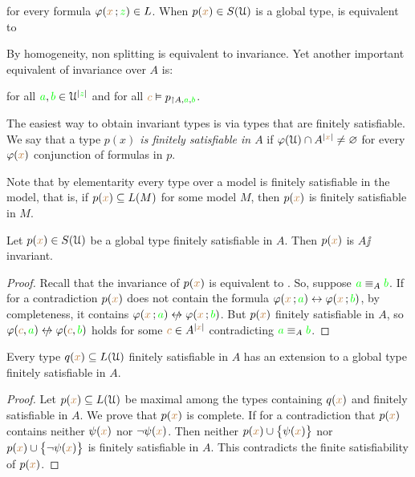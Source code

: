 \documentclass[creche.tex]{subfiles}
\begin{document}
for every formula $\varphi({\color{brown} x}\,;{\color{green} z})\in L$. When $p({\color{brown} x})\in S(\EuScript U)$ is a global type,  is equivalent to


By homogeneity, non splitting is equivalent to invariance. Yet another important equivalent of invariance over $A$ is:

\hfill for all ${\color{green} a},{\color{green} b}\in\EuScript U^{|{\color{green} z}|}$ and for all ${\color{brown} c}\vDash p_{\restriction A,{\color{green} a},{\color{green} b}}$. 

The easiest way to obtain invariant types is via types that are finitely satisfiable. We say that a type \emph{$p(x)$ is finitely satisfiable in $A$\/} if $\varphi(\EuScript U)\cap A^{|{\color{brown} x}|}\neq\varnothing$ for every $\varphi({\color{brown} x})$ conjunction of formulas in $p$. 

Note that by elementarity every type over a model is finitely satisfiable in the model, that is, if $p({\color{brown} x})\subseteq L(M)$ for some model $M$, then $p({\color{brown} x})$ is finitely satisfiable in $M$.


\begin{proposition}\label{prop_coeredi_invarienti}
Let $p({\color{brown} x})\in S(\EuScript U)$ be a global type finitely satisfiable in $A$. Then $p({\color{brown} x})$ is $A\jj$in\-vari\-ant.
\end{proposition}

\begin{proof}
Recall that the invariance of $p({\color{brown} x})$ is equivalent to . So, suppose ${\color{green} a}\equiv_A{\color{green} b}$. If for a contradiction $p({\color{brown} x})$ does not contain the formula $\varphi({\color{brown} x}\,;{\color{green} a})\leftrightarrow\varphi({\color{brown} x}\,;{\color{green} b})$, by completeness, it contains  $\phi({\mr x}\,;{\gr a})\niff\phi({\mr x}\,;{\gr b})$. But $p({\color{brown} x})$ finitely satisfiable in $A$, so $\phi({\mr c},{\gr a})\niff\phi({\mr c},{\gr b})$ holds for some ${\color{brown} c}\in A^{|{\color{brown} x}|}$ contradicting ${\color{green} a}\equiv_A{\color{green} b}$.
\end{proof}


\begin{proposition}\label{prop_exisntence_coheirs}
Every type $q({\color{brown} x})\subseteq L(\EuScript U)$ finitely satisfiable in $A$ has an extension to a global type finitely satisfiable in $A$.
\end{proposition}

\begin{proof} 
Let $p({\color{brown} x})\subseteq L(\EuScript U)$ be maximal among the types containing $q({\color{brown} x})$ and finitely satisfiable in $A$. We prove that $p({\color{brown} x})$ is complete. If for a contradiction that $p({\color{brown} x})$ contains neither $\psi({\color{brown} x})$ nor $\neg\psi({\color{brown} x})$. Then  neither $p({\color{brown} x})\cup\big\{\psi({\color{brown} x})\big\}$ nor $p({\color{brown} x})\cup\big\{\neg\psi({\color{brown} x})\big\}$ is finitely satisfiable in $A$. This contradicts the finite satisfiability of $p({\color{brown} x})$.
\end{proof}
\end{document}
